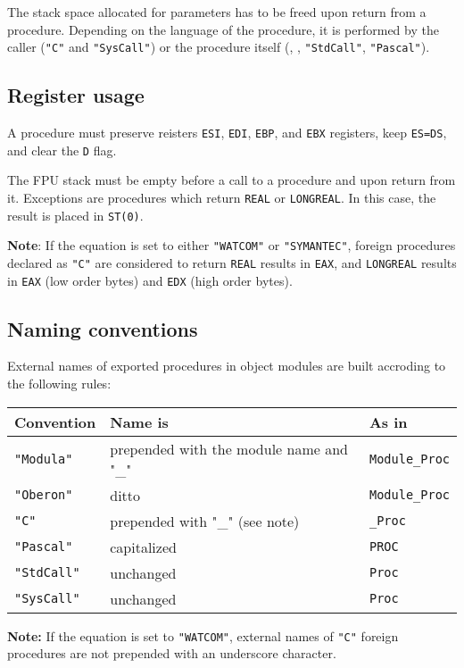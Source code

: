 The stack space allocated for parameters has to be freed upon return
from a procedure. Depending on the language of the procedure,
it is performed by the caller (\verb'"C"' and \verb'"SysCall"') or
the procedure itself (\mt{}, \ot{}, \verb'"StdCall"', \verb'"Pascal"').

\subsection{Register usage}

A procedure must preserve reisters \verb'ESI', \verb'EDI', \verb'EBP',
and \verb'EBX' registers, keep \verb'ES=DS', and clear the \verb'D' flag.

The FPU stack must be empty before a call to a procedure and upon
return from it. Exceptions are procedures which return \verb'REAL' or
\verb'LONGREAL'. In this case, the result is placed in \verb'ST(0)'.

{\bf Note}: If the  equation is set to either \verb'"WATCOM"' or
\verb'"SYMANTEC"', foreign procedures declared as \verb'"C"' are considered
to return \verb'REAL' results in \verb'EAX', and \verb'LONGREAL' results
in \verb'EAX' (low order bytes) and \verb'EDX' (high order bytes).

\subsection{Naming conventions}

External names of exported procedures in object modules are
built accroding to the following rules:

\begin{center}
\begin{tabular}{lll}
\bf Convention & \bf Name is & \bf As in \\
\hline
\tt "Modula"       & prepended with the module name and "\_" & \verb'Module_Proc' \\
\tt "Oberon"       & ditto                                 & \verb'Module_Proc' \\
\tt "C"            & prepended with "\_" (see note)        & \verb'_Proc'       \\
\tt "Pascal"       & capitalized                           & \verb'PROC'        \\
\tt "StdCall"      & unchanged                             & \verb'Proc'        \\
\tt "SysCall"      & unchanged                             & \verb'Proc'        \\
\end{tabular}
\end{center}

{\bf Note:} If the  equation is set to \verb'"WATCOM"',
external names of \verb'"C"' foreign procedures are {\em} not prepended
with an underscore character.

